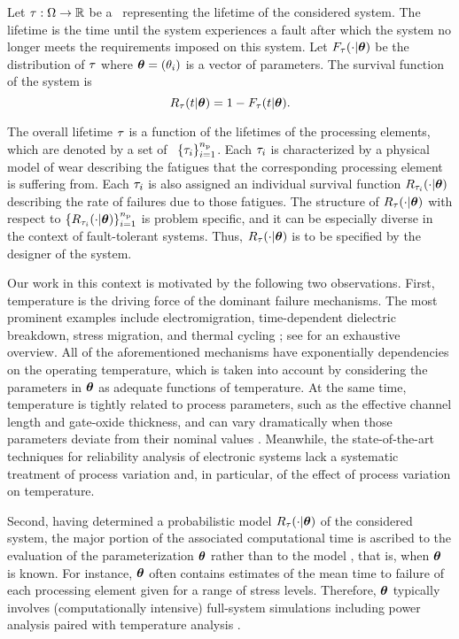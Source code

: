 Let $\tau: \Omega \to \mathbb{R}$ be a \rv\ representing the lifetime of the considered system.
The lifetime is the time until the system experiences a fault after which the system no longer meets the requirements imposed on this system.
Let $F_\tau(\cdot | \bm{\theta})$ be the distribution of $\tau$ where $\bm{\theta} = (\theta_i)$ is a vector of parameters.
The survival function of the system is
\[
  R_\tau(t | \bm{\theta}) = 1 - F_\tau(t | \bm{\theta}).
\]

The overall lifetime $\tau$ is a function of the lifetimes of the processing elements, which are denoted by a set of \rvs\ $\{ \tau_i \}_{i = 1}^{n_\text{p}}$.
Each $\tau_i$ is characterized by a physical model of wear \cite{jedec} describing the fatigues that the corresponding processing element is suffering from.
Each $\tau_i$ is also assigned an individual survival function $R_{\tau_i}(\cdot | \bm{\theta})$ describing the rate of failures due to those fatigues.
The structure of $R_\tau(\cdot | \bm{\theta})$ with respect to $\{ R_{\tau_i}(\cdot | \bm{\theta}) \}_{i = 1}^{n_\text{p}}$ is problem specific, and it can be especially diverse in the context of fault-tolerant systems.
Thus, $R_\tau(\cdot | \bm{\theta})$ is to be specified by the designer of the system.

Our work in this context is motivated by the following two observations.
First, temperature is the driving force of the dominant failure mechanisms.
The most prominent examples include electromigration, time-dependent dielectric breakdown, stress migration, and thermal cycling \cite{xiang2010}; see \cite{jedec} for an exhaustive overview.
All of the aforementioned mechanisms have exponentially dependencies on the operating temperature, which is taken into account by considering the parameters in $\bm{\theta}$ as adequate functions of temperature.
At the same time, temperature is tightly related to process parameters, such as the effective channel length and gate-oxide thickness, and can vary dramatically when those parameters deviate from their nominal values \cite{ukhov2014, juan2012}.
Meanwhile, the state-of-the-art techniques for reliability analysis of electronic systems lack a systematic treatment of process variation and, in particular, of the effect of process variation on temperature.

Second, having determined a probabilistic model $R_\tau(\cdot | \bm{\theta})$ of the considered system, the major portion of the associated computational time is ascribed to the evaluation of the parameterization $\bm{\theta}$ rather than to the model \perse, that is, when $\bm{\theta}$ is known.
For instance, $\bm{\theta}$ often contains estimates of the mean time to failure of each processing element given for a range of stress levels.
Therefore, $\bm{\theta}$ typically involves (computationally intensive) full-system simulations including power analysis paired with temperature analysis \cite{xiang2010}.

